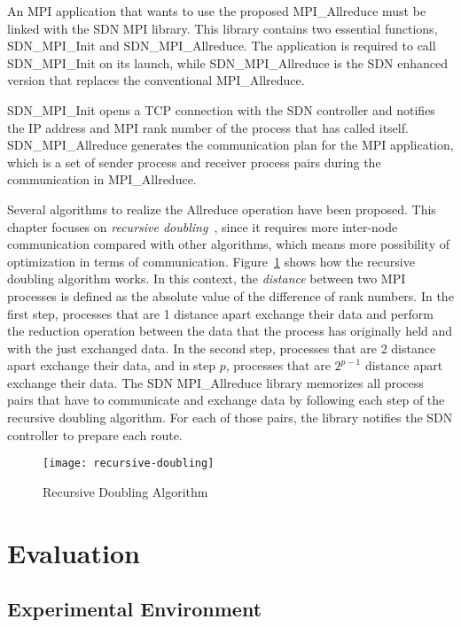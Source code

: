 An MPI application that wants to use the proposed MPI\_Allreduce must be
linked with the SDN MPI library. This library contains two
essential functions, SDN\_MPI\_Init and SDN\_MPI\_Allreduce. The application
is required to call SDN\_MPI\_Init on its launch, while SDN\_MPI\_Allreduce is
the SDN enhanced version that replaces the conventional MPI\_Allreduce.

SDN\_MPI\_Init opens a TCP connection with the SDN controller and notifies the
IP address and MPI rank number of the process that has called itself.
SDN\_MPI\_Allreduce generates the communication plan for the MPI application,
which is a set of sender process and receiver process pairs during the
communication in MPI\_Allreduce.

Several algorithms to realize the Allreduce operation have been proposed. This
chapter focuses on \emph{recursive doubling}~\autocite{Thakur2005}, since it
requires more inter-node communication compared with other algorithms, which
means more possibility of optimization in terms of communication.
Figure~\ref{fig:recursive-doubling} shows how the recursive doubling algorithm
works. In this context, the \emph{distance} between two MPI processes is
defined as the absolute value of the difference of rank numbers. In the first
step, processes that are 1 distance apart exchange their data and perform the
reduction operation between the data that the process has originally held and
with the just exchanged data. In the second step, processes that are 2
distance apart exchange their data, and in step \(p\), processes that are
\(2^{p - 1}\) distance apart exchange their data. The SDN MPI\_Allreduce
library memorizes all process pairs that have to communicate and exchange data
by following each step of the recursive doubling algorithm. For each of those
pairs, the library notifies the SDN controller to prepare each route.

\begin{figure}
    \centering
    \texttt{[image: recursive-doubling]}
    \caption{Recursive Doubling Algorithm}%
    \label{fig:recursive-doubling}
\end{figure}

\section{Evaluation}\label{sec:iii-evaluation}

\subsection{Experimental Environment}

